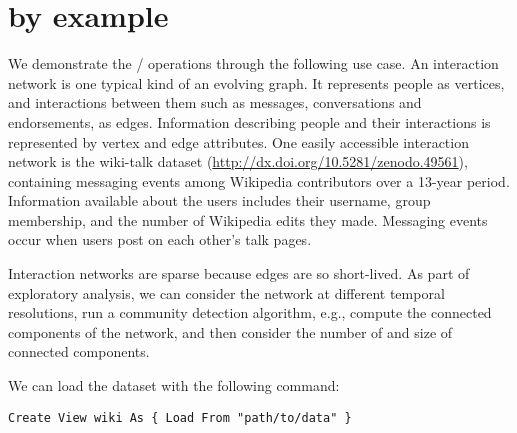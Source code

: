 \section{\ql by example}
\label{sec:cases}

We demonstrate the \tga / \ql operations through the following use
case.  An interaction network is one typical kind of an evolving
graph.  It represents people as vertices, and interactions between
them such as messages, conversations and endorsements, as edges.
Information describing people and their interactions is represented by
vertex and edge attributes.  One easily accessible interaction network
is the wiki-talk dataset
(\url{http://dx.doi.org/10.5281/zenodo.49561}), containing messaging
events among Wikipedia contributors over a 13-year period.
Information available about the users includes their username, group
membership, and the number of Wikipedia edits they made.  Messaging
events occur when users post on each other's talk pages.  


Interaction networks are sparse because edges are so short-lived.  As
part of exploratory analysis, we can consider the network at different
temporal resolutions, run a community detection algorithm, e.g.,
compute the connected components of the network, and then consider the
number of and size of connected components.




\begin{example}
\label{ex:load}
We can load the dataset with the following command:

\begin{small} 
\begin{verbatim}
Create View wiki As { Load From "path/to/data" }
\end{verbatim}
\end{small}
\end{example}

